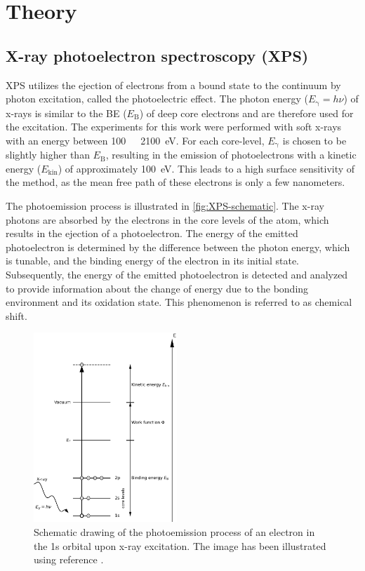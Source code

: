\chapter{Theory}
\section{X-ray photoelectron spectroscopy (XPS)}

\Acf{XPS} utilizes the ejection of electrons from a bound state to the continuum by photon excitation, called the photoelectric effect.\autocite{Hertz1887, Einstein1905} The photon energy ($E_\mathrm{\gamma}=h\nu$) of x-rays is similar to the \acl{BE} ($E_\mathrm{B}$) of deep core electrons and are therefore used for the excitation. The experiments for this work were performed with soft x-rays with an energy between 100~~~2100~\si{\eV}. For each core-level, $E_\mathrm{\gamma}$ is chosen to be slightly higher than $E_\mathrm{B}$, resulting in the emission of photoelectrons with a kinetic energy ($E_\mathrm{kin}$) of approximately 100~\si{\eV}. This leads to a high surface sensitivity of the method, as the mean free path of these electrons is only a few nanometers.\autocite{Fairley2021}

The photoemission process is illustrated in \autoref{fig:XPS-schematic}. The x-ray photons are absorbed by the electrons in the core levels of the atom, which results in the ejection of a photoelectron. The energy of the emitted photoelectron is determined by the difference between the photon energy, which is tunable, and the binding energy of the electron in its initial state. Subsequently, the energy of the emitted photoelectron is detected and analyzed to provide information about the change of energy due to the bonding environment and its oxidation state. This phenomenon is referred to as chemical shift.\autocite{Kolasinski2012}

\begin{figure}[htb]
	\centering
	\includegraphics[width=0.48\textwidth]{images/XPS_schematic.png}
	\caption{Schematic drawing of the photoemission process of an electron in the 1s orbital upon x-ray excitation. The image has been illustrated using reference \cite{Attard1998}.}
	\label{fig:XPS-schematic}
\end{figure}

